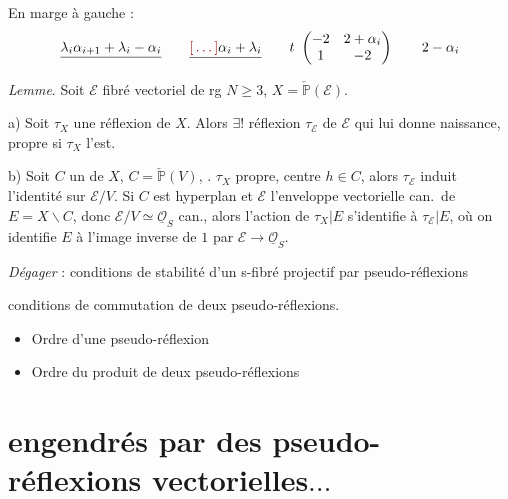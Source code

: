 \documentclass[11pt,a4paper]{article}
\begin{document}
En marge à gauche :
\[
\struck{\lambda_i \alpha_{i+1} + \lambda_i - \alpha_i} \qquad \struck{\ill{} \alpha_i + \lambda_i} \qquad t\ \begin{pmatrix} -2 & 2 + \alpha_i \\ 1 & -2 \end{pmatrix} \qquad 2 - \alpha_i
\]


\emph{Lemme}. Soit $\mathcal{E}$ fibré vectoriel de rg $N \geq 3$, $X = \check{\mathbb{P}}(\mathcal{E})$.

a) Soit $\tau_X$ une réflexion de $X$. Alors $\exists !$ réflexion $\tau_{\mathcal{E}}$ de $\mathcal{E}$ qui lui donne naissance, propre \struck{\ill{}} si $\tau_X$ l'est.

b) Soit $C$ un   de $X$,  $C = \check{\mathbb{P}}(V)$, . $\tau_X$ propre, centre $h \in C$,  alors  $\tau_{\mathcal{E}}$ induit l'identité sur $\mathcal{E}/V$. Si $C$ est hyperplan et $\mathcal{E}$ l'enveloppe vectorielle can.\ de $E = X \smallsetminus C$, donc $\mathcal{E}/V \simeq \underline{\mathcal{O}}_S$ can., alors l'action de $\tau_X | E$  s'identifie à $\tau_{\mathcal{E}} | E$, où on identifie $E$ à l'image inverse de $1$ par $\mathcal{E} \to \underline{\mathcal{O}}_S$.

\emph{Dégager} : conditions de stabilité d'un s-fibré projectif par pseudo-réflexions

conditions de commutation de deux pseudo-réflexions.

\begin{itemize}
\item Ordre d'une pseudo-réflexion
\item Ordre du produit de deux pseudo-réflexions
\end{itemize}

\section{ engendrés par des pseudo-réflexions vectorielles$\dots$}
\end{document}
